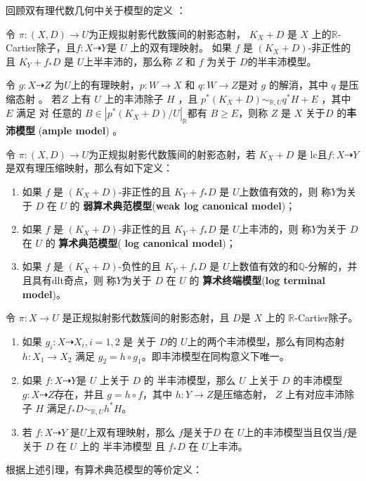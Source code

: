 回顾双有理代数几何中关于模型的定义 \cite{BCHM10}：
\begin{definition}
	\cite[Definition 3.6.5]{BCHM10} 令 $ \pi:(X,D)\to U $为正规拟射影代数簇间的射影态射， $K_{X}+D$ 是 $X$ 上的$\mathbb{R}$-Cartier除子，且$ f: X\dashrightarrow Y $是 $U$ 上的双有理映射。  如果 $ f $ 是 $ (K_X+D) $-非正性的且 $ K_Y+f_*D $ 是 $ U $上半丰沛的，那么称 $Z$ 和 $f$ 为关于 $D$的半丰沛模型。

	令 $ g:X\dashrightarrow Z $ 为$ U $上的有理映射，$p:W \to X $ 和 $q:W \to Z $是对 $g$ 的解消，其中 $q$ 是压缩态射 。 若$Z$ 上有 $U$ 上的丰沛除子 $H$ ，且 $p^*(K_{X}+D) \sim_{\mathbb{R},U} q^*H+E$ ，其中 $E$  满足    对 任意的 $B \in |p^*(K_{X}+D)/U|_{\mathbb{R}}$都有 $B\geqslant E$，则称 $Z$ 是 $X$ 关于$D$ 的\textbf{丰沛模型} (\textbf{ample model}) 。
\end{definition}
\begin{definition}\label{models}
	\cite[Definition 3.6.7]{BCHM10} 令 $ \pi:(X,D)\to U $为正规拟射影代数簇间的射影态射，若 $ K_X+D $ 是 lc且$ f:X\dashrightarrow Y $是双有理压缩映射，那么有如下定义：
	\begin{enumerate}
		\item 如果 $f$ 是  $ (K_X+D) $-非正性的且 $ K_Y+f_*D $ 是 $ U $上数值有效的，则  称$ Y $为关于 $D$ 在 $U$ 的  \textbf{弱算术典范模型}(\textbf{weak log canonical model})；
		\item 如果 $f$ 是  $ (K_X+D) $-非正性的且 $ K_Y+f_*D $ 是 $ U $上丰沛的，则  称$ Y $为关于 $D$ 在 $U$ 的  \textbf{算术典范模型}(\textbf{ log canonical model})；
		\item 如果 $f$ 是  $ (K_X+D) $-负性的且 $ K_Y+f_*D $ 是 $ U $上数值有效的和$\mathbb{Q}$-分解的，并且具有dlt奇点，则  称$ Y $为关于 $D$ 在 $U$ 的  \textbf{算术终端模型}(\textbf{log terminal model})。
	\end{enumerate}
\end{definition}

\begin{lemma}\cite[lemmama 3.6.6]{BCHM10}
	令 $\pi:X \to U$ 是正规拟射影代数簇间的射影态射，且 $D$是 $X$ 上的 $\mathbb{R}$-Cartier除子。

	\begin{enumerate}
		\item 如果 $g_{i}:X \dashrightarrow X_{i}, i=1,2$ 是 关于 $D$的  $U$上的两个丰沛模型，那么有同构态射 $h:X_{1}\to X_{2}$ 满足 $g_{2}=h \circ g_{1}$。即丰沛模型在同构意义下唯一。
		\item 如果 $f:X \dashrightarrow Y$是 $U$ 上关于 $D$ 的 半丰沛模型，那么 $U$ 上关于 $D$ 的丰沛模型 $g:X \dashrightarrow  Z$存在，并且 $g=h \circ f$，其中 $h:Y \to Z$是压缩态射， $Z$ 上有对应丰沛除子 $H$  满足$f_*D \sim_{\mathbb{R},U}h^*H$。
		\item  若 $f:X \dashrightarrow Y$  是$U$上双有理映射，那么 $f$是关于$D$ 在 $U$上的丰沛模型当且仅当$f$是关于 $D$ 在 $U$ 上的  半丰沛模型 且 $f_*D$ 在 $U$上丰沛。
	\end{enumerate}
\end{lemma}
根据上述引理，有算术典范模型的等价定义：

